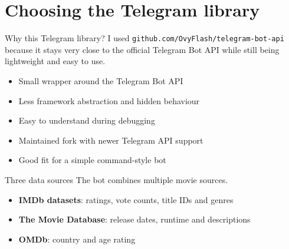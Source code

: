 \documentclass[aspectratio=169,10pt]{beamer}
\begin{document}
\section{Choosing the Telegram library}

\begin{frame}{Why this Telegram library?}
  \Large
  I used \texttt{github.com/OvyFlash/telegram-bot-api}
  because it stays very close to the official Telegram Bot API
  while still being lightweight and easy to use.

  \vspace{0.45cm}
  \normalsize
  \begin{itemize}
    \item Small wrapper around the Telegram Bot API
    \item Less framework abstraction and hidden behaviour
    \item Easy to understand during debugging
    \item Maintained fork with newer Telegram API support
    \item Good fit for a simple command-style bot
  \end{itemize}
\end{frame}

\begin{frame}{Three data sources}
  \Large
  The bot combines multiple movie sources.

  \vspace{0.45cm}
  \normalsize
  \begin{itemize}
    \item \textbf{IMDb datasets}: ratings, vote counts, title IDs and genres
    \item \textbf{The Movie Database}: release dates, runtime and descriptions
    \item \textbf{OMDb}: country and age rating
  \end{itemize}
\end{frame}
\end{document}

